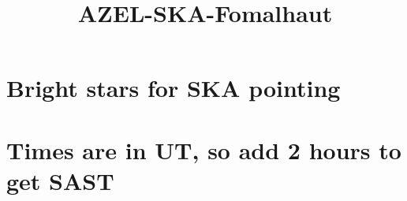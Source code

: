 \documentclass[11pt]{article}
\title{AZEL-SKA-Fomalhaut}
\begin{document}
    
    
    \maketitle
    
    

    
    \section{Bright stars for SKA
pointing}\label{bright-stars-for-ska-pointing}

\section{Times are in UT, so add 2 hours to get
SAST}\label{times-are-in-ut-so-add-2-hours-to-get-sast}
\end{document}
